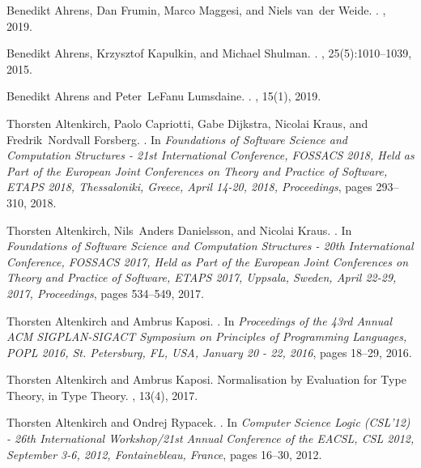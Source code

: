 \documentclass[9pt]{entcs}
\newcommand{\0}{\textbf{0}} %
\begin{document}
\begin{thebibliography}{10}
	
	Benedikt Ahrens, Dan Frumin, Marco Maggesi, and Niels van~der Weide.
	.
	, 2019.
	
	Benedikt Ahrens, Krzysztof Kapulkin, and Michael Shulman.
	.
	, 25(5):1010--1039,
	2015.
	
	Benedikt Ahrens and Peter~LeFanu Lumsdaine.
	.
	, 15(1), 2019.
	
	Thorsten Altenkirch, Paolo Capriotti, Gabe Dijkstra, Nicolai Kraus, and
	Fredrik~Nordvall Forsberg.
	.
	\newblock In {\em Foundations of Software Science and Computation Structures -
		21st International Conference, {FOSSACS} 2018, Held as Part of the European
		Joint Conferences on Theory and Practice of Software, {ETAPS} 2018,
		Thessaloniki, Greece, April 14-20, 2018, Proceedings}, pages 293--310, 2018.
	
	Thorsten Altenkirch, Nils~Anders Danielsson, and Nicolai Kraus.
	.
	\newblock In {\em Foundations of Software Science and Computation Structures -
		20th International Conference, {FOSSACS} 2017, Held as Part of the European
		Joint Conferences on Theory and Practice of Software, {ETAPS} 2017, Uppsala,
		Sweden, April 22-29, 2017, Proceedings}, pages 534--549, 2017.
	
	Thorsten Altenkirch and Ambrus Kaposi.
	.
	\newblock In {\em Proceedings of the 43rd Annual {ACM} {SIGPLAN-SIGACT}
		Symposium on Principles of Programming Languages, {POPL} 2016, St.
		Petersburg, FL, USA, January 20 - 22, 2016}, pages 18--29, 2016.
	
	Thorsten Altenkirch and Ambrus Kaposi.
	\newblock Normalisation by Evaluation for Type Theory, in Type Theory.
	, 13(4), 2017.
	
	Thorsten Altenkirch and Ondrej Rypacek.
	.
	\newblock In {\em Computer Science Logic (CSL'12) - 26th International
		Workshop/21st Annual Conference of the EACSL, {CSL} 2012, September 3-6,
		2012, Fontainebleau, France}, pages 16--30, 2012.
	

\end{thebibliography}
\end{document}
